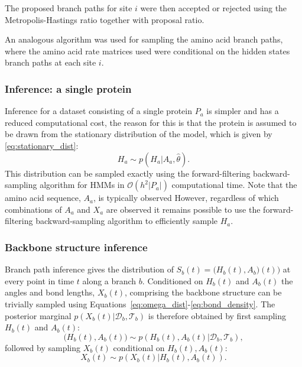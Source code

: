 \documentclass[nogrid]{MBE}%
\begin{document}
The proposed branch paths for site $i$ were then accepted or rejected using the Metropolis-Hastings ratio together with proposal ratio.

An analogous algorithm was used for sampling the amino acid branch paths, where the amino acid rate matrices used were conditional on the hidden states branch paths at each site $i$.

\subsubsection{Inference: a single protein}
Inference for a dataset consisting of a single protein $P_{a}$ is simpler and has a reduced computational cost, the reason for this is that the protein is assumed to be drawn from the stationary distribution of the model, which is given by \eqref{eq:stationary_dist}:
\begin{equation}
H_{a} \sim p(H_{a}|A_{a},\hat{\theta}).
\end{equation}
This distribution can be sampled exactly using the forward-filtering backward-sampling algorithm for HMMs \citep{fruhwirth1994data} in $\mathcal{O}(h^{2}|P_{a}|)$ computational time. Note that the amino acid sequence, $A_{a}$, is typically observed However, regardless of which combinations of $A_{a}$ and $X_{a}$ are observed it remains possible to use the forward-filtering backward-sampling algorithm to efficiently sample $H_{a}$.

\subsubsection{Backbone structure inference}
Branch path inference gives the distribution of $S_{b}(t)=\big(H_{b}(t),A_{b}\big)(t))$ at every point in time $t$ along a branch $b$. Conditioned on $H_{b}(t)$ and $A_{b}(t)$ the angles and bond lengths, $X_{b}(t)$, comprising the backbone structure can be trivially sampled using Equations~\ref{eq:omega_dist}-\ref{eq:bond_density}. The posterior marginal $p(X_{b}(t)|\mathcal{D}_{b},\mathcal{T}_{b})$ is therefore obtained by first sampling $H_{b}(t)$ and $A_{b}(t)$:
\begin{equation}
\big(H_{b}(t),A_{b}(t)\big) \sim p(H_{b}(t),A_{b}(t)|\mathcal{D}_{b},\mathcal{T}_{b}),
\end{equation}
followed by sampling $X_{b}(t)$ conditional on $H_{b}(t),A_{b}(t)$:
\begin{equation}
X_{b}(t) \sim p(X_{b}(t)|H_{b}(t),A_{b}(t)).
\end{equation}
\end{document}

